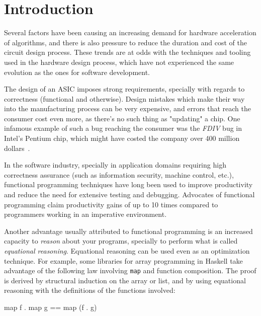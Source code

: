 \chapter{Introduction}
\label{chap:intro}
    Several factors have been causing an increasing demand for hardware acceleration of algorithms,
    and there is also pressure to reduce the duration and cost of the circuit design process.
    These trends are at odds with the techniques and tooling used in the hardware design process,
    which have not experienced the same evolution as the ones for software development.

    The design of an \ac{ASIC} imposes strong requirements,
    specially with regards to correctness (functional and otherwise).
    Design mistakes which make their way into the manufacturing process can be very expensive,
    and errors that reach the consumer cost even more, as there's no such thing as "updating" a chip.
    One infamous example of such a bug reaching the consumer was the \emph{FDIV} bug in Intel's Pentium chip,
    which might have costed the company over 400 million dollars~\cite{intel-fdiv}.

    In the software industry, specially in application domains requiring high correctness assurance
    (such as information security, machine control, etc.),
    functional programming techniques have long been used to improve productivity
    and reduce the need for extensive testing and debugging.
    Advocates of functional programming claim productivity gains of up to 10 times compared to
    programmers working in an imperative environment.

    Another advantage usually attributed to functional programming is an increased capacity to
    \emph{reason} about your programs, specially to perform what is called \emph{equational reasoning}.
    Equational reasoning can be used even as an optimization technique.
    For example, some libraries for array programming in Haskell take advantage of the following
    law involving \texttt{map} and function composition.
    The proof is derived by structural induction on the array or list,
    and by using equational reasoning with the definitions of the functions involved:

    {\centering
        \begin{haskellcode}
            map f . map g == map (f . g)
        \end{haskellcode}
    }

